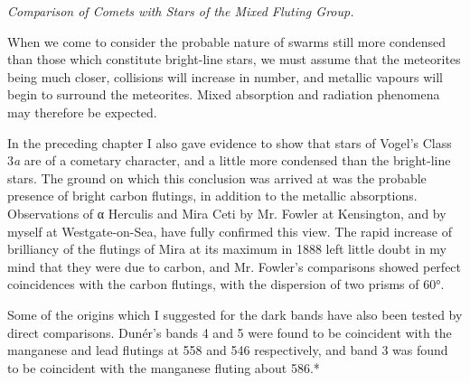 \documentclass[a4paper, 12pt, oneside, polutonikogreek, english]{article}
\begin{document}
\emph{Comparison of Comets with Stars of the Mixed Fluting Group.}

When we come to consider the probable nature of swarms still more condensed than those which constitute bright-line stars, we must assume that the meteorites being much closer, collisions will increase in number, and metallic vapours will begin to surround the meteorites. Mixed absorption and radiation phenomena may therefore be expected.

In the preceding chapter I also gave evidence to show that stars of Vogel's Class 3\emph{a} are of a cometary character, and a little more condensed than the bright-line stars. The ground on which this conclusion was arrived at was the probable presence of bright carbon flutings, in addition to the metallic absorptions. Observations of α Herculis and Mira Ceti by Mr. Fowler at Kensington, and by myself at Westgate-on-Sea, have fully confirmed this view. The rapid increase of brilliancy of the flutings of Mira at its maximum in 1888 left little doubt in my mind that they were due to carbon, and Mr. Fowler's comparisons showed perfect coincidences with the carbon flutings, with the dispersion of two prisms of 60°.

Some of the origins which I suggested for the dark bands have also been tested by direct comparisons. Dunér's bands 4 and 5 were found to be coincident with the manganese and lead flutings at 558 and 546 respectively, and band 3 was found to be coincident with the manganese fluting about 586.*
\end{document}
